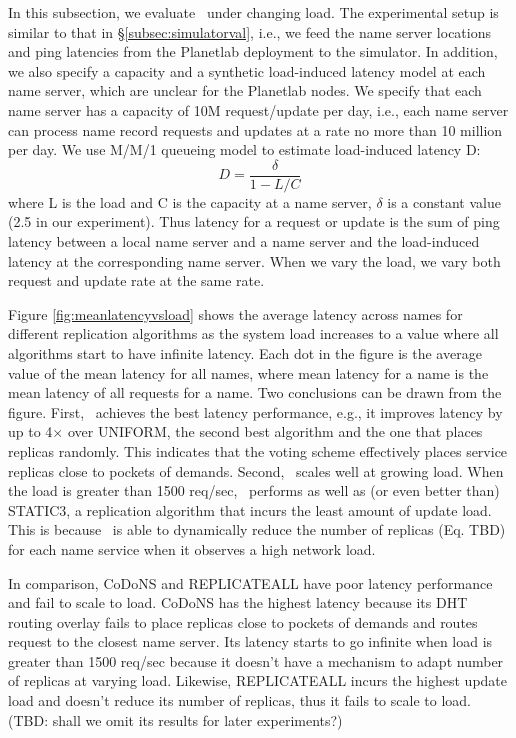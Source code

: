 In this subsection, we evaluate \auspice\ under changing load. The experimental setup is similar to that in \S \ref{subsec:simulatorval}, i.e., we feed the name server locations and ping latencies from the Planetlab deployment to the simulator. In addition, we also specify a capacity and a synthetic load-induced latency model at each name server, which are unclear for the Planetlab nodes. We specify that each name server has a capacity of 10M request/update per day, i.e., each name server can process name record requests and updates at a rate no more than 10 million per day. We use M/M/1 queueing model \cite{mm1} to estimate  load-induced latency D:
$$D = \frac{\delta}{1- L/C}$$
where L is the load and C is the capacity at a name server, $\delta$ is a constant value (2.5 in our experiment). Thus latency for a request or update is the sum of ping latency between a local name server and a name server and the load-induced latency at the corresponding name server. When we vary the load, we vary both request and update rate at the same rate.

Figure \ref{fig:meanlatencyvsload} shows the average latency across names for different replication algorithms as the system load increases to a value where all algorithms start to have infinite latency. Each dot in the figure is the average value of the mean latency for all names, where mean latency for a name is the mean latency of all requests for a name.
Two conclusions can be drawn from the figure.
First, \auspice\ achieves the best latency performance, e.g., it improves latency by up to 4$\times$ over UNIFORM, the second best  algorithm and the one that places replicas randomly. This indicates that the voting scheme effectively places service replicas close to pockets of demands. 
Second, \auspice\ scales well at growing load. When the load is greater than 1500 req/sec, \auspice\ performs as well as (or even better than) STATIC3, a replication algorithm that incurs the least amount of update load. This is because \auspice\ is able to dynamically reduce the number of replicas (Eq. TBD) for each name service when it observes a high network load.

In comparison, CoDoNS and REPLICATEALL have poor latency performance and fail to scale to load. 
CoDoNS has the highest latency because its DHT routing overlay fails to place replicas close to pockets of demands and routes request to the closest name server. Its latency starts to go infinite when load is greater than 1500 req/sec because it doesn't have a mechanism to adapt number of replicas at varying load. 
Likewise, REPLICATEALL incurs the highest update load and doesn't reduce its number of replicas, thus it fails to scale to load. (TBD: shall we omit its results for later experiments?)


